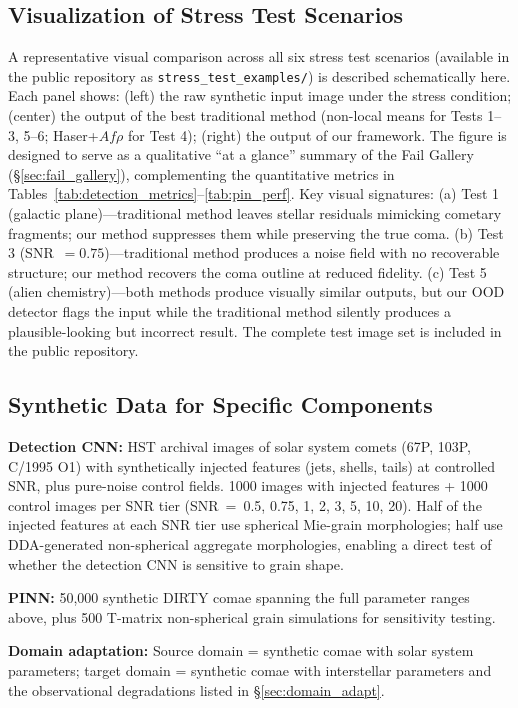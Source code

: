 \documentclass[usenatbib]{mnras}
\begin{document}
\subsection{Visualization of Stress Test Scenarios}

A representative visual comparison across all six stress test scenarios (available in the public repository as \texttt{stress\_test\_examples/}) is described schematically here. Each panel shows: (left) the raw synthetic input image under the stress condition; (center) the output of the best traditional method (non-local means for Tests 1--3, 5--6; Haser+$Af\rho$ for Test 4); (right) the output of our framework. The figure is designed to serve as a qualitative ``at a glance'' summary of the Fail Gallery (\S\ref{sec:fail_gallery}), complementing the quantitative metrics in Tables~\ref{tab:detection_metrics}--\ref{tab:pin_perf}. Key visual signatures: (a) Test 1 (galactic plane)---traditional method leaves stellar residuals mimicking cometary fragments; our method suppresses them while preserving the true coma. (b) Test 3 (SNR~$=0.75$)---traditional method produces a noise field with no recoverable structure; our method recovers the coma outline at reduced fidelity. (c) Test 5 (alien chemistry)---both methods produce visually similar outputs, but our OOD detector flags the input while the traditional method silently produces a plausible-looking but incorrect result. The complete test image set is included in the public repository.

\subsection{Synthetic Data for Specific Components}

\textbf{Detection CNN:} HST archival images of solar system comets (67P, 103P, C/1995 O1) with synthetically injected features (jets, shells, tails) at controlled SNR, plus pure-noise control fields. 1000 images with injected features + 1000 control images per SNR tier (SNR~=~0.5, 0.75, 1, 2, 3, 5, 10, 20). Half of the injected features at each SNR tier use spherical Mie-grain morphologies; half use DDA-generated non-spherical aggregate morphologies, enabling a direct test of whether the detection CNN is sensitive to grain shape.

\textbf{PINN:} 50,000 synthetic DIRTY comae spanning the full parameter ranges above, plus 500 T-matrix non-spherical grain simulations for sensitivity testing.

\textbf{Domain adaptation:} Source domain = synthetic comae with solar system parameters; target domain = synthetic comae with interstellar parameters and the observational degradations listed in \S\ref{sec:domain_adapt}.
\end{document}
